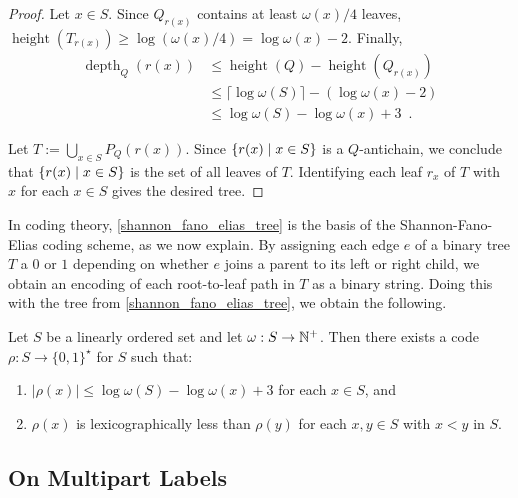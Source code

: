 \documentclass{patmorin}
\renewcommand{\le}{\leqslant}
\renewcommand{\geq}{\geqslant}
\DeclareMathOperator{\height}{height}
\DeclareMathOperator{\depth}{depth}
\DeclarePairedDelimiter{\set}{\{}{\}}
\begin{document}
\begin{proof}
  Let $x\in S$. Since $Q_{r(x)}$ contains at least $\omega(x)/4$ leaves, $\height(T_{r(x)}) \geq \log(\omega(x)/4) = \log\omega(x) - 2$. Finally,
  \begin{align*}
    \depth_Q(r(x))
     & \le \height(Q)-\height(Q_{r(x)})                    \\
     & \le \lceil\log\omega(S)\rceil - (\log\omega(x) - 2) \\
     & \le \log\omega(S) - \log\omega(x) +3 \enspace.
  \end{align*}

  Let $T:=\bigcup_{x\in S} P_Q(r(x))$.
  Since $\set{r(x) \mid x\in S}$ is a $Q$-antichain,
  we conclude that $\set{r(x)\mid x\in S}$ is the set of all leaves of $T$.
  Identifying each leaf $r_x$ of $T$ with $x$ for each $x\in S$ gives the desired tree.
\end{proof}

In coding theory, \cref{shannon_fano_elias_tree} is the basis of the Shannon-Fano-Elias coding scheme, as we now explain.  By assigning each edge $e$ of a binary tree $T$ a $0$ or $1$ depending on whether $e$ joins a parent to its left or right child, we obtain an encoding of each root-to-leaf path in $T$ as a binary string. Doing this with the tree from \cref{shannon_fano_elias_tree}, we obtain the following.

\begin{cor}\label{shannon_fano_elias_code}
  Let $S$ be a linearly ordered set and let $\omega:S\to\mathbb{N}^+$.  Then there exists a code $\rho:S\to \{0,1\}^\star$ for $S$ such that:
  \begin{enumerate}[nosep,nolistsep,label=(\alph*)]
    \item $|\rho(x)|\le \log\omega(S) - \log\omega(x)+3$ for each $x\in S$, and
    \item $\rho(x)$ is lexicographically less than $\rho(y)$ for each $x,y\in S$ with $x< y$ in $S$.
  \end{enumerate}
\end{cor}

\subsection{On Multipart Labels}
\label{multipart}
\end{document}
